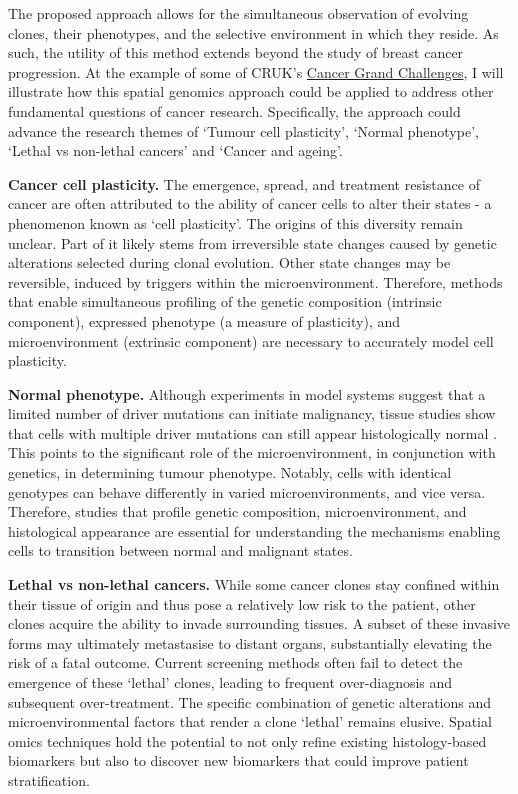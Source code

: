 The proposed approach allows for the simultaneous observation of evolving clones, their phenotypes, and the selective environment in which they reside. As such, the utility of this method extends beyond the study of breast cancer progression. At the example of some of CRUK's \href{https://cancergrandchallenges.org/}{Cancer Grand Challenges}, I will illustrate how this spatial genomics approach could be applied to address other fundamental questions of cancer research. Specifically, the approach could advance the research themes of `Tumour cell plasticity', `Normal phenotype', `Lethal vs non-lethal cancers' and `Cancer and ageing'.

\textbf{Cancer cell plasticity.} The emergence, spread, and treatment resistance of cancer are often attributed to the ability of cancer cells to alter their states - a phenomenon known as `cell plasticity'. The origins of this diversity remain unclear. Part of it likely stems from irreversible state changes caused by genetic alterations selected during clonal evolution. Other state changes may be reversible, induced by triggers within the microenvironment. Therefore, methods that enable simultaneous profiling of the genetic composition (intrinsic component), expressed phenotype (a measure of plasticity), and microenvironment (extrinsic component) are necessary to accurately model cell plasticity.

\textbf{Normal phenotype.} Although experiments in model systems suggest that a limited number of driver mutations can initiate malignancy, tissue studies show that cells with multiple driver mutations can still appear histologically normal . This points to the significant role of the microenvironment, in conjunction with genetics, in determining tumour phenotype. Notably, cells with identical genotypes can behave differently in varied microenvironments, and vice versa. Therefore, studies that profile genetic composition, microenvironment, and histological appearance are essential for understanding the mechanisms enabling cells to transition between normal and malignant states.

\textbf{Lethal vs non-lethal cancers.} While some cancer clones stay confined within their tissue of origin and thus pose a relatively low risk to the patient, other clones acquire the ability to invade surrounding tissues. A subset of these invasive forms may ultimately metastasise to distant organs, substantially elevating the risk of a fatal outcome. Current screening methods often fail to detect the emergence of these `lethal' clones, leading to frequent over-diagnosis and subsequent over-treatment. The specific combination of genetic alterations and microenvironmental factors that render a clone `lethal' remains elusive. Spatial omics techniques hold the potential to not only refine existing histology-based biomarkers but also to discover new biomarkers that could improve patient stratification.


